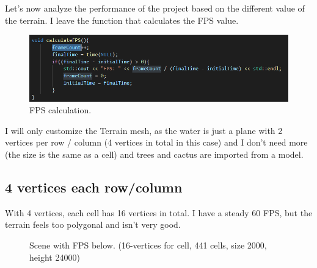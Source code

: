 \noindent
Let's now analyze the performance of the project based on the different value of the terrain. I leave the function that calculates the FPS value.

\begin{figure}[hbt!]
	\centering
	\includegraphics[width= 1
	\textwidth]{images/fps2.png}
	\caption{FPS calculation.}
\end{figure}

\noindent
I will only customize the Terrain mesh, as the water is just a plane with 2 vertices per row / column (4 vertices in total in this case) and I don't need more (the size is the same as a cell) and trees and cactus are imported from a model.

\subsection{4 vertices each row/column}
With 4 vertices, each cell has 16 vertices in total. I have a steady 60 FPS, but the terrain feels too polygonal and isn't very good.

\newpage

\begin{figure}[hbt!]
	\centering
	
	\noindent{}%
	
	\caption{Scene with FPS below. (16-vertices for cell, 441 cells, size 2000, height 24000)}
\end{figure} 

